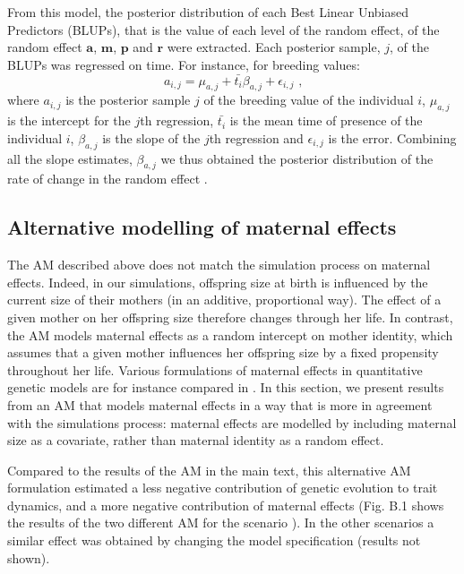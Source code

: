 From this model, the posterior distribution of each Best Linear Unbiased Predictors (BLUPs), that is the value of each level of the random effect, of the random effect $\boldsymbol{a}$, $\boldsymbol{m}$, $\boldsymbol{p}$ and $\boldsymbol{r}$ were extracted. 
Each posterior sample, $j$, of the BLUPs was regressed on time. For instance, for breeding values:
\begin{equation}
a_{i,j} = \mu_{a,j} + \bar{t_i} \beta_{a,j} + \epsilon_{i,j} \text{ ,}
\end{equation}
where $a_{i,j}$ is the posterior sample $j$ of the breeding value of the individual $i$, $\mu_{a,j}$ is the intercept for the $j$th regression, $\bar{t_i}$ is the mean time of presence of the individual $i$,  $\beta_{a,j}$ is the slope of the $j$th regression and  $\epsilon_{i,j}$ is the error. 
Combining all the slope estimates, $\beta_{a,j}$ we thus obtained the posterior distribution of the rate of change in the random effect \parencite{Hadfield2010b}.

\subsection{Alternative modelling of maternal effects}\label{app:am:newres}
The AM described above does not match the simulation process on maternal effects. Indeed, in our simulations, offspring size at birth is influenced by the current size of their mothers (in an additive, proportional way). The effect of a given mother on her offspring size therefore changes through her life. In contrast, the AM models maternal effects as a random intercept on mother identity, which assumes that a given mother influences her offspring size by a fixed propensity  throughout her life.
Various formulations of maternal effects in quantitative genetic models are for instance compared in \cite{Mcglothlin2014}. In this section, we present results from an AM that models maternal effects in a way that is more in agreement with the simulations process: maternal effects are modelled by including maternal size as a covariate, rather than maternal identity as a random effect.

Compared to the results of the AM in the main text, this alternative AM formulation estimated a less negative contribution of genetic evolution to trait dynamics, and a more negative contribution of maternal effects (Fig. B.1 shows the results of the two different AM for the scenario \sh). In the other scenarios a similar effect was obtained by changing the model specification (results not shown).

